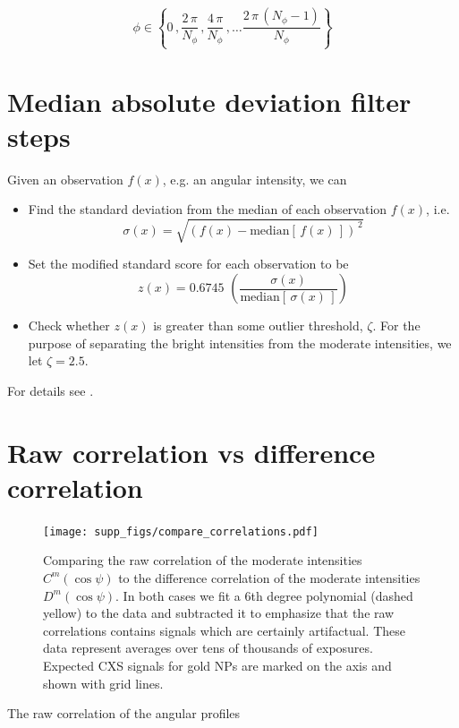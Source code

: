\documentclass [12pt,fleqn]{article}
\def \be {\begin{equation}}
\def \ee {\end{equation}}
\begin{document}
\begin{equation}
\phi \in \left \{ 0\,, \frac{2\,\pi}{N_\phi}\,, \frac{4\,\pi}{N_\phi}\,, \dots \frac{2\,\pi\,(N_\phi-1)}{N_\phi} \right \}
\end{equation}

\section{Median absolute deviation filter steps} \label{outlier_filter}

Given an observation $f(x)$, e.g. an angular intensity, we can

\begin{itemize} 
\item Find the standard deviation from the median of each observation $f(x)$, i.e. 
\be
\sigma(x) = \sqrt{ \left ( f(x) - \text{median} \left [\,f(x) \,\right ] \right) ^{\,2}}
\ee
\item Set the modified standard score for each observation to be 
\be
z(x) = 0.6745 \,\, \left( \frac{\sigma(x)}{\text{median}\left[\,\sigma(x)\,\right]} \right )
\ee

\item Check whether $z(x)$ is greater than some outlier threshold, $\zeta$. For the purpose of separating the bright intensities from the moderate intensities, we let $\zeta = 2.5$.
\end{itemize}

For details see \cite{iglewicz1993volume}.
  
\section{Raw correlation vs difference correlation}
\begin{figure}[H]
\texttt{[image: supp\_figs/compare\_correlations.pdf]}
\caption{Comparing the raw correlation of the moderate intensities $C^m(\cos \psi)$ to the difference correlation of the moderate intensities $D^m(\cos \psi)$. In both cases we fit a 6th degree polynomial (dashed yellow) to the data and subtracted it to emphasize that the raw correlations contains signals which are certainly artifactual. These data represent averages over tens of thousands of exposures. Expected CXS signals for gold NPs are marked on the axis and shown with grid lines.}
\label{fig:compare_correlations}
\end{figure}

The raw correlation of the angular profiles
\end{document}
